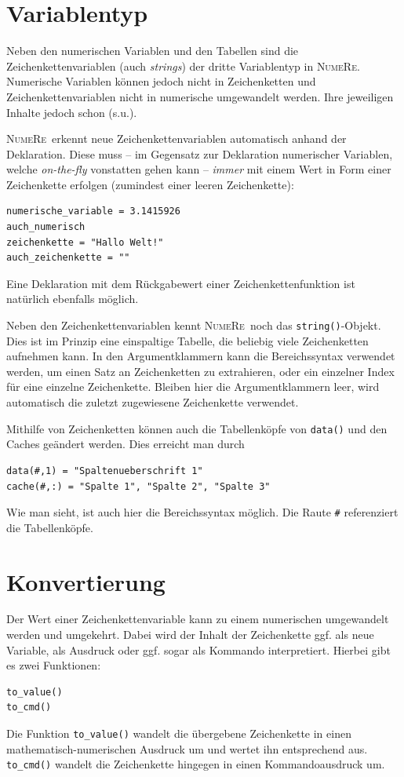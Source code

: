 \documentclass[DIV=14,headsepline,footsepline]{scrbook}
\newcommand{\NR}{\textsc{Nu\-me\-Re}}
\begin{document}
			\section{Variablentyp}
				Neben den numerischen Variablen und den Tabellen sind die Zeichenkettenvariablen (auch \emph{strings}) der dritte Variablentyp in \NR. Numerische Variablen können jedoch nicht in Zeichenketten und Zeichenkettenvariablen nicht in numerische umgewandelt werden. Ihre jeweiligen Inhalte jedoch schon (s.u.).
				
				\NR\ erkennt neue Zeichenkettenvariablen automatisch anhand der Deklaration. Diese muss -- im Gegensatz zur Deklaration numerischer Variablen, welche \emph{on-the-fly} vonstatten gehen kann -- \emph{immer} mit einem Wert in Form einer Zeichenkette erfolgen (zumindest einer leeren Zeichenkette):
				\begin{lstlisting}
numerische_variable = 3.1415926
auch_numerisch
zeichenkette = "Hallo Welt!"
auch_zeichenkette = ""
				\end{lstlisting}
				Eine Deklaration mit dem Rückgabewert einer Zeichenkettenfunktion ist natürlich ebenfalls möglich.
				
				Neben den Zeichenkettenvariablen kennt \NR\ noch das \lstinline+string()+-Objekt. Dies ist im Prinzip eine einspaltige Tabelle, die beliebig viele Zeichenketten aufnehmen kann. In den Argumentklammern kann die Bereichssyntax verwendet werden, um einen Satz an Zeichenketten zu extrahieren, oder ein einzelner Index für eine einzelne Zeichenkette. Bleiben hier die Argumentklammern leer, wird automatisch die zuletzt zugewiesene Zeichenkette verwendet.
				
				Mithilfe von Zeichenketten können auch die Tabellenköpfe von \lstinline+data()+ und den Caches geändert werden. Dies erreicht man durch
				\begin{lstlisting}
data(#,1) = "Spaltenueberschrift 1"
cache(#,:) = "Spalte 1", "Spalte 2", "Spalte 3"
				\end{lstlisting}
				Wie man sieht, ist auch hier die Bereichssyntax möglich. Die Raute \lstinline+#+ referenziert die Tabellenköpfe.
				
			\section{Konvertierung}
				Der Wert einer Zeichenkettenvariable kann zu einem numerischen umgewandelt werden und umgekehrt. Dabei wird der Inhalt der Zeichenkette ggf. als neue Variable, als Ausdruck oder ggf. sogar als Kommando interpretiert. Hierbei gibt es zwei Funktionen:
				\begin{lstlisting}
to_value()
to_cmd()
				\end{lstlisting}
				Die Funktion \lstinline+to_value()+ wandelt die übergebene Zeichenkette in einen ma\-the\-ma\-tisch-nu\-me\-ri\-schen Ausdruck um und wertet ihn entsprechend aus. \lstinline+to_cmd()+ wandelt die Zeichenkette hingegen in einen Kommandoausdruck um.
				
\end{document}
